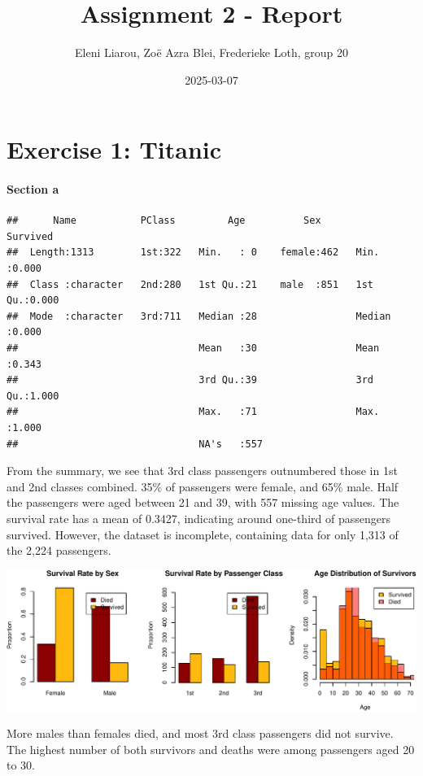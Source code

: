 \documentclass[
  11pt,
]{article}
\title{Assignment 2 - Report}
\author{Eleni Liarou, Zoë Azra Blei, Frederieke Loth, group 20}
\date{2025-03-07}
\begin{document}
\maketitle

\section{Exercise 1: Titanic}\label{exercise-1-titanic}

\paragraph{Section a}\label{section-a}

\begin{verbatim}
##      Name           PClass         Age          Sex         Survived    
##  Length:1313        1st:322   Min.   : 0    female:462   Min.   :0.000  
##  Class :character   2nd:280   1st Qu.:21    male  :851   1st Qu.:0.000  
##  Mode  :character   3rd:711   Median :28                 Median :0.000  
##                               Mean   :30                 Mean   :0.343  
##                               3rd Qu.:39                 3rd Qu.:1.000  
##                               Max.   :71                 Max.   :1.000  
##                               NA's   :557
\end{verbatim}

From the summary, we see that 3rd class passengers outnumbered those in
1st and 2nd classes combined. 35\% of passengers were female, and 65\%
male. Half the passengers were aged between 21 and 39, with 557 missing
age values. The survival rate has a mean of 0.3427, indicating around
one-third of passengers survived. However, the dataset is incomplete,
containing data for only 1,313 of the 2,224 passengers.

\includegraphics{ReportAssignment2_files/figure-latex/unnamed-chunk-2-1.pdf}

More males than females died, and most 3rd class passengers did not
survive. The highest number of both survivors and deaths were among
passengers aged 20 to 30.
\end{document}
